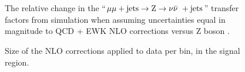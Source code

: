 \begin{figure}[!h]
{  } \\
   ~
  \caption{\label{fig:tfSyst_nlo_mmZinv} The relative change in the
    ``$\mu\mu + \textrm{jets} \rightarrow {\text Z} \rightarrow \nu\bar{\nu}\ + \textrm{jets}$'' transfer factors from
    simulation when assuming uncertainties equal in magnitude to QCD +
    EWK NLO corrections versus Z boson \Pt.  }
\end{figure}

\clearpage
\begin{figure}[!h]
  \centering
  \caption{\label{fig:NLO_app_zinv} Size of the NLO corrections applied to data per \mht bin, in the signal region.
	}
\end{figure}


